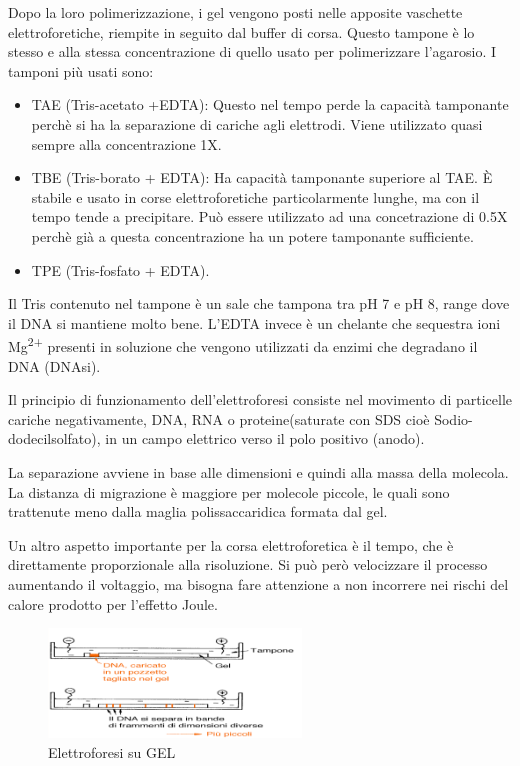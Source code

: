 Dopo la loro polimerizzazione, i gel vengono posti nelle apposite vaschette elettroforetiche,
riempite in seguito dal buffer di corsa.
Questo tampone è lo stesso e alla stessa concentrazione di quello usato per polimerizzare l'agarosio.
\vspace{0.3cm}
I tamponi più usati sono:
\begin{itemize}

\item{TAE (Tris-acetato +EDTA): }
Questo nel tempo perde la capacità tamponante perchè si ha la separazione
di cariche agli elettrodi. Viene utilizzato quasi sempre alla concentrazione 1X.

\item{TBE (Tris-borato + EDTA):}
Ha capacità tamponante superiore al TAE.
\`E stabile e usato in corse elettroforetiche particolarmente lunghe,
ma con il tempo tende a precipitare.
Può essere utilizzato ad una concetrazione di 0.5X perchè già a questa
concentrazione ha un potere tamponante sufficiente.

\item{TPE (Tris-fosfato + EDTA).}

 \end{itemize}

Il Tris contenuto nel tampone è un sale che tampona tra pH 7 e pH 8, range dove il DNA
si mantiene molto bene. L'EDTA invece è un chelante che sequestra ioni Mg\textsuperscript{2+}
presenti in soluzione che vengono utilizzati da enzimi che degradano il DNA (DNAsi).

Il principio di funzionamento dell'elettroforesi consiste nel movimento di particelle
cariche negativamente, DNA, RNA o proteine(saturate con SDS cioè Sodio-dodecilsolfato),
in un campo elettrico verso il polo positivo (anodo).

La separazione avviene in base alle dimensioni e quindi alla massa della molecola.
La distanza di migrazione è maggiore per molecole piccole, le quali sono trattenute meno dalla maglia
polissaccaridica formata dal gel.

Un altro aspetto importante per la corsa elettroforetica è il tempo,
che è direttamente proporzionale alla risoluzione. Si può però velocizzare il processo
aumentando il voltaggio, ma bisogna fare attenzione a non incorrere nei rischi del
calore prodotto per l'effetto Joule.

\begin{figure}[H]

	\centering
	\includegraphics[width=0.6\textwidth]{./immagini/elettroforesi.png}
	\caption{Elettroforesi su GEL}
	\label{elettroforesi}

\end{figure}

